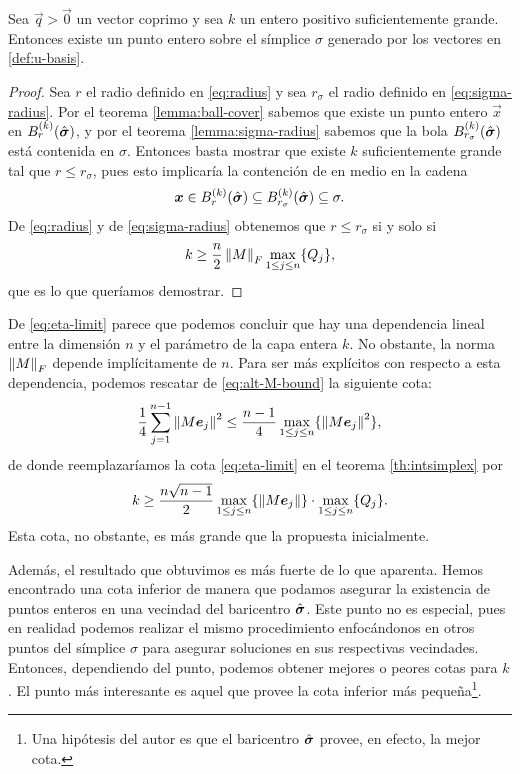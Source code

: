\begin{theorem}
	\label{th:intsimplex}
	Sea $\vec{q} > \vec{0}$ un vector coprimo y sea $k$ un entero positivo suficientemente grande.
	Entonces existe un punto entero sobre el símplice $\sigma$ generado por los vectores en
	\eqref{def:u-basis}.
\end{theorem}
\begin{proof}
	Sea $r$ el radio definido en \eqref{eq:radius} y sea $r_\sigma$ el radio definido en
	\eqref{eq:sigma-radius}. Por el teorema \ref{lemma:ball-cover} sabemos que existe un punto
	entero $\vec{x}$ en $B_r^{(k)}(\hat{\boldsymbol{ \sigma }})$, y por el teorema \ref{lemma:sigma-radius} sabemos
	que la bola $B_{r_\sigma}^{(k)}(\hat{\boldsymbol{ \sigma }})$ está contenida en $\sigma$. Entonces basta
	mostrar que existe $k$ suficientemente grande tal que $r \leq r_\sigma$, pues esto implicaría la
	contención de en medio en la cadena
	\begin{equation*}
		\boldsymbol{x} \in B_r^{(k)}(\hat{\boldsymbol{ \sigma }}) \subseteq B_{r_\sigma}^{(k)}(\hat{\boldsymbol{ \sigma }}) \subseteq \sigma.
	\end{equation*}
	De \eqref{eq:radius} y de \eqref{eq:sigma-radius} obtenemos que $r \leq r_\sigma$ si y solo si
	\begin{equation}
		\label{eq:eta-limit}
		k \geq \frac{n}{2}\left\lVert M \right\rVert_F\max_{1 \leq j \leq n} \lbrace Q_j \rbrace,
	\end{equation}
	que es lo que queríamos demostrar.
\end{proof}
De \eqref{eq:eta-limit} parece que podemos concluir que hay una dependencia lineal entre la
dimensión $n$ y el parámetro de la capa entera $k$. No obstante, la norma $\left\lVert M \right\rVert_F$ depende
implícitamente de $n$. Para ser más explícitos con respecto a esta dependencia, podemos rescatar de
\eqref{eq:alt-M-bound} la siguiente cota:
\begin{equation*}
	\frac{1}{4}\sum_{j=1}^{n-1}\left\lVert M\boldsymbol{e}_j \right\rVert^2
	\leq
	\frac{n-1}{4}\max_{1 \leq j \leq n} \lbrace \left\lVert M\boldsymbol{e}_j \right\rVert^2 \rbrace,
\end{equation*}
de donde reemplazaríamos la cota \eqref{eq:eta-limit} en el teorema \ref{th:intsimplex} por
\begin{equation*}
	k \geq \frac{n\sqrt{n-1}}{2} \max_{1 \leq j \leq n} \lbrace \left\lVert M\boldsymbol{e}_j \right\rVert \rbrace \cdot
	\max_{1 \leq j \leq n} \lbrace Q_j \rbrace.
\end{equation*}
Esta cota, no obstante, es más grande que la propuesta inicialmente.

Además, el resultado que obtuvimos es más fuerte de lo que aparenta. Hemos encontrado una
cota inferior de manera que podamos asegurar la existencia de puntos enteros en una vecindad del
baricentro $\hat{\boldsymbol{ \sigma }}$. Este punto no es especial, pues en realidad podemos realizar el mismo
procedimiento enfocándonos en otros puntos del símplice $\sigma$ para asegurar soluciones en sus
respectivas vecindades. Entonces, dependiendo del punto, podemos obtener mejores o peores cotas para
$k$. El punto más interesante es aquel que provee la cota inferior más pequeña\footnote{
	Una hipótesis del autor es que el baricentro $\hat{\boldsymbol{ \sigma }}$ provee, en efecto, la mejor cota.
}.

